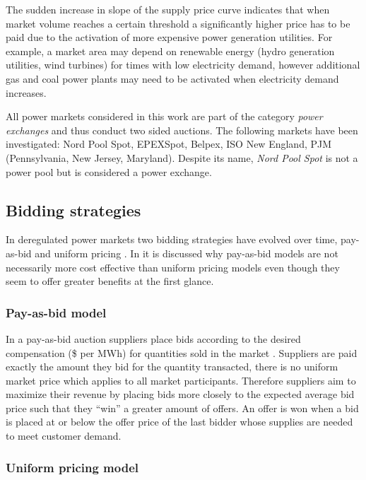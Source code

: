 The sudden increase in slope of the supply price curve indicates that when market volume reaches a certain threshold a significantly higher price has to be paid due to the activation of more expensive power generation utilities. For example, a market area may depend on renewable energy (hydro generation utilities, wind turbines) for times with low electricity demand, however additional gas and coal power plants may need to be activated when electricity demand increases. 

All power markets considered in this work are part of the category \textit{power exchanges} and thus conduct two sided auctions. The following markets have been investigated: Nord Pool Spot, EPEXSpot, Belpex, ISO New England, PJM (Pennsylvania, New Jersey, Maryland). Despite its name, \textit{Nord Pool Spot} is not a power pool but is considered a power exchange. 


\subsection{Bidding strategies} \label{ssec:bidding_strategies}

In deregulated power markets two bidding strategies have evolved over time, pay-as-bid and uniform pricing \cite{weron2007modeling,tierney2008uniform}. In \cite{tierney2008uniform} it is discussed why pay-as-bid models are not necessarily more cost effective than uniform pricing models even though they seem to offer greater benefits at the first glance. 

\subsubsection{Pay-as-bid model}

In a pay-as-bid auction suppliers place bids according to the desired compensation (\$ per MWh) for quantities sold in the market \cite{tierney2008uniform}. Suppliers are paid exactly the amount they bid for the quantity transacted, there is no uniform market price which applies to all market participants. Therefore suppliers aim to maximize their revenue by placing bids more closely to the expected average bid price such that they "`win"' a greater amount of offers. An offer is won when a bid is placed at or below the offer price of the last bidder whose supplies are needed to meet customer demand. 

\subsubsection{Uniform pricing model}

